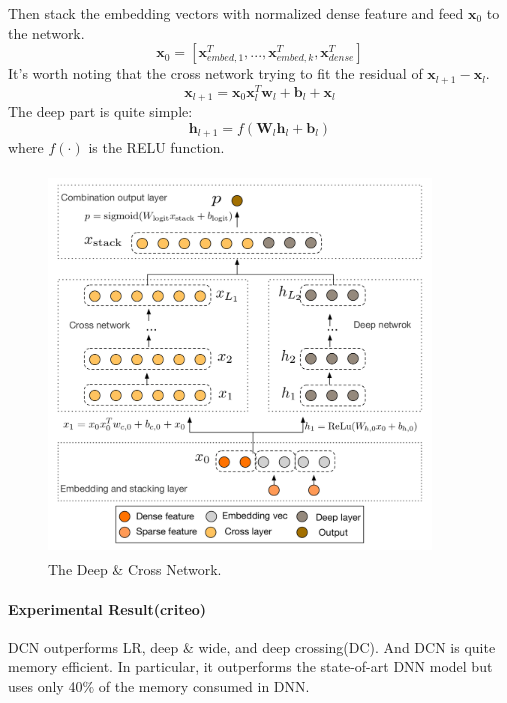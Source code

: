 \documentclass{article}
\begin{document}
Then stack the embedding vectors with normalized dense feature and feed $\textbf{x}_{0}$ to the network.
$$\textbf{x}_{0}=[\textbf{x}_{embed,1}^{T},...,\textbf{x}_{embed,k}^{T},\textbf{x}_{dense}^{T} ]$$
It's worth noting that the cross network trying to fit the residual of $\textbf{x}_{l+1}-\textbf{x}_{l}$.
$$\textbf{x}_{l+1}=\textbf{x}_{0}\textbf{x}_{l}^{T}\textbf{w}_{l} +\textbf{b}_{l} + \textbf{x}_{l}$$
The deep part is quite simple:
$$\textbf{h}_{l+1}=f(\textbf{W}_{l}\textbf{h}_{l}+\textbf{b}_{l})$$
where $f(\cdot)$ is the RELU function.
\begin{figure}[H]
\centering
\includegraphics[width=4in,height=4in]{dcn}
\caption{The Deep \& Cross Network.}
\end{figure}

\paragraph{Experimental Result(criteo)} DCN outperforms LR, deep \& wide, and deep crossing(DC). And DCN is quite memory efficient. In particular, it outperforms the state-of-art DNN model but uses only 40$\%$ of the memory consumed in DNN.


\end{document}
